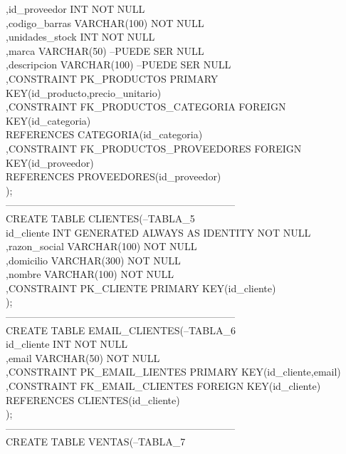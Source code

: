 \documentclass[10pt]{report}
\begin{document}
\begin{flushleft}
		,id\_proveedor       INT               NOT NULL\\
		,codigo\_barras 	    VARCHAR(100)	  NOT NULL\\
		,unidades\_stock     INT 	 		  NOT NULL\\
		,marca		        VARCHAR(50)  --PUEDE SER NULL\\
		,descripcion	    VARCHAR(100) --PUEDE SER NULL\\
		,CONSTRAINT PK\_PRODUCTOS PRIMARY\\ KEY(id\_producto,precio\_unitario)\\
		,CONSTRAINT FK\_PRODUCTOS\_CATEGORIA FOREIGN\\ KEY(id\_categoria)\\
		REFERENCES CATEGORIA(id\_categoria)\\
		,CONSTRAINT FK\_PRODUCTOS\_PROVEEDORES FOREIGN\\ KEY(id\_proveedor)\\
		REFERENCES PROVEEDORES(id\_proveedor)\\
	);\\
	---------------------------------------------------------------------\\
	CREATE TABLE CLIENTES(--TABLA\_5\\
		 id\_cliente   INT GENERATED ALWAYS AS IDENTITY NOT NULL\\
		,razon\_social VARCHAR(100)		NOT NULL\\
		,domicilio    VARCHAR(300)		NOT NULL\\
		,nombre		  VARCHAR(100)		NOT NULL\\	  
		,CONSTRAINT PK\_CLIENTE PRIMARY KEY(id\_cliente)\\
	);\\
	---------------------------------------------------------------------\\
	CREATE TABLE EMAIL\_CLIENTES(--TABLA\_6\\
		 id\_cliente INT			NOT NULL\\
		,email		VARCHAR(50)	NOT NULL\\
		,CONSTRAINT PK\_EMAIL\_LIENTES PRIMARY KEY(id\_cliente,email)\\
		,CONSTRAINT FK\_EMAIL\_CLIENTES FOREIGN KEY(id\_cliente)\\
		REFERENCES CLIENTES(id\_cliente)\\
	);\\
	---------------------------------------------------------------------\\
	CREATE TABLE VENTAS(--TABLA\_7\\

\end{flushleft}
\end{document}
